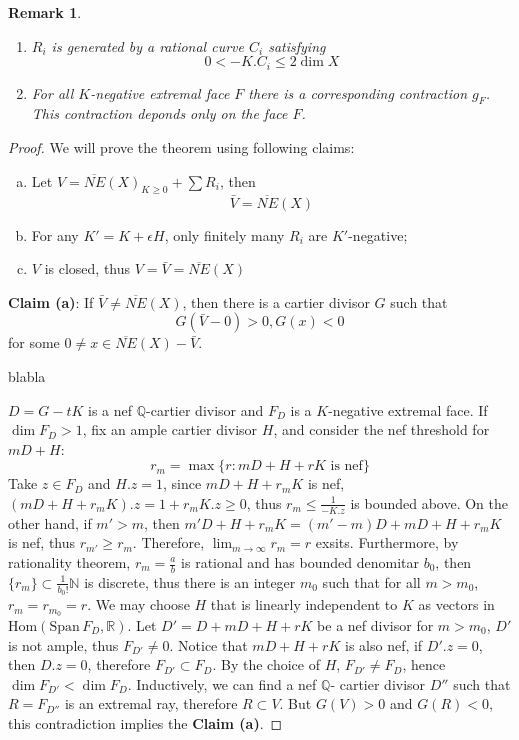 \documentclass{article}
\newtheorem{rmk}[defn]{Remark}
\begin{document}
\begin{rmk}
	\begin{enumerate}
		\item $ R_i $ is generated by a rational curve $ C_i $  satisfying 
		$$ 0<-K.C_i\leqslant2\dim X $$
		\item For all $ K $-negative extremal face $ F $ there is a corresponding contraction $ g_F $. This contraction deponds only on the face $ F $.
	\end{enumerate}
\end{rmk}
\begin{proof}
	We will prove the theorem using following claims:
	\begin{enumerate}[(a)]
		\item Let $ V=\overline{NE}(X)_{K\geqslant0}+\sum R_i $, then $$ \bar{V}=\overline{NE}(X) $$
		\item For any $ K'=K+\epsilon H $, only finitely many $ R_i $ are $ K' $-negative;
		\item $ V $ is closed, thus $ V=\bar{V}=\overline{NE}(X) $ 
	\end{enumerate}

\textbf{Claim (a)}: If $ \bar{V} \neq \overline{NE}(X) $, then there is a cartier divisor $ G $ such that 
$$ G(\bar{V}-0)>0,G(x)<0 $$
for some $ 0\neq x\in\overline{NE}(X)-\bar{V}  $.

blabla

$ D=G-tK $ is  a nef $ \mathbb{Q} $-cartier divisor and $ F_D $ is a $ K $-negative extremal face. If $ \dim F_D>1 $, fix an ample cartier divisor $ H $, and consider the nef threshold for $ mD+H $:
$$ r_m=\max \{r :  mD+H+rK \text{ is nef}  \} $$
 Take $ z\in F_D $ and $ H.z=1 $, since $ mD+H+r_mK $ is nef, 
$ (mD+H+r_mK).z=1+r_mK.z\geqslant 0 $, thus $ r_m\leqslant \frac{1}{-K.z} $ is bounded above. On the other hand, if $ m'>m $, then $ m'D+H+r_mK=(m'-m)D+mD+H+r_mK $ is nef, thus $ r_{m'}\geqslant r_m $. Therefore, $ \lim_{m\to \infty}r_m=r $ exsits. Furthermore, by rationality theorem, $ r_m=\frac{a}{b} $ is rational and has bounded denomitar $ b_0 $, then $ \{  r_m\}\subset \frac{1}{b_0!}\mathbb{N} $ is discrete, thus there is an integer $ m_0 $ such that for all $ m>m_0 $, $ r_m=r_{m_0}=r $. We may choose $ H $ that is linearly independent to  $ K $ as vectors in $ \mathrm{Hom}(\mathrm{Span}\,F_D, \mathbb{R}) $. Let $ D'=D+mD+H+rK $ be a nef divisor for $ m>m_0 $, $ D' $ is not ample, thus $ F_{D'}\neq 0 $. Notice that $ mD+H+rK $ is also nef,  if $ D'.z=0 $, then $ D.z=0 $, therefore $ F_{D'}\subset F_{D} $. By the choice of $ H $, $  F_{D'}\neq F_{D} $, hence $ \dim F_{D'}< \dim F_{D} $. Inductively, we can find a nef $ \mathbb{Q} $- cartier divisor $ D'' $ such that $ R= F_{D''} $ is an extremal ray, therefore $ R\subset V $. But $ G(V)>0 $ and $ G(R)<0 $, this contradiction implies the \textbf{Claim (a)}.


\end{proof}
\end{document}
